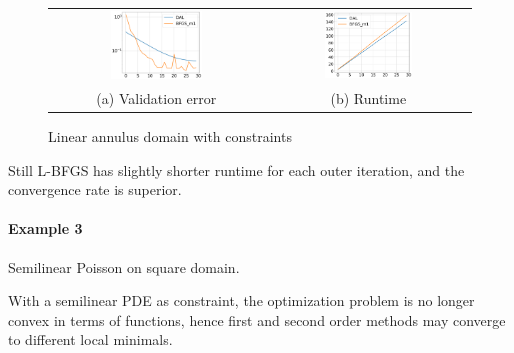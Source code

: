\documentclass{article}
\begin{document}
\begin{figure}[hbt]
    \centering
    \begin{tabular}{cc}
    \includegraphics[width=0.45\textwidth]{figures/linear_ctd.png}
    &\includegraphics[width=0.45\textwidth]{figures/linear_ctd_time.png} \\ 
    (a) Validation error & (b) Runtime
    \end{tabular}
    \caption{Linear annulus domain with constraints}
\label{fig:annulus_loss_ctd}
\end{figure}

Still L-BFGS has slightly shorter runtime for each outer iteration, and the convergence rate is superior. 

\paragraph*{Example 3} Semilinear Poisson on square domain.

With a semilinear PDE as constraint, the optimization problem is no longer convex in terms of functions, hence first and second order methods may converge to different local minimals. 
\end{document}
